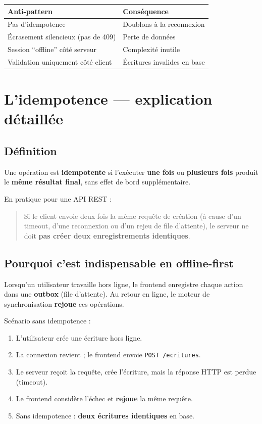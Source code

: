 \documentclass[12pt,a4paper]{report}
\begin{document}
\begin{longtable}{@{}p{5cm}p{7.5cm}@{}}
\hline
\textbf{Anti-pattern} & \textbf{Conséquence} \\
\hline
\endhead
Pas d'idempotence & Doublons à la reconnexion \\
\hline
Écrasement silencieux (pas de 409) & Perte de données \\
\hline
Session ``offline'' côté serveur & Complexité inutile \\
\hline
Validation uniquement côté client & Écritures invalides en base \\
\hline
\end{longtable}

\chapter{L'idempotence --- explication détaillée}

\section{Définition}

Une opération est \textbf{idempotente} si l'exécuter \textbf{une fois} ou \textbf{plusieurs fois} produit le \textbf{même résultat final}, sans effet de bord supplémentaire.

En pratique pour une API REST :
\begin{quote}
Si le client envoie deux fois la même requête de création (à cause d'un timeout, d'une reconnexion ou d'un rejeu de file d'attente), le serveur ne doit \textbf{pas créer deux enregistrements identiques}.
\end{quote}

\section{Pourquoi c'est indispensable en offline-first}

Lorsqu'un utilisateur travaille hors ligne, le frontend enregistre chaque action dans une \textbf{outbox} (file d'attente). Au retour en ligne, le moteur de synchronisation \textbf{rejoue} ces opérations.

Scénario sans idempotence :
\begin{enumerate}
  \item L'utilisateur crée une écriture hors ligne.
  \item La connexion revient ; le frontend envoie \texttt{POST /ecritures}.
  \item Le serveur reçoit la requête, crée l'écriture, mais la réponse HTTP est perdue (timeout).
  \item Le frontend considère l'échec et \textbf{rejoue} la même requête.
  \item Sans idempotence : \textbf{deux écritures identiques} en base.
\end{enumerate}
\end{document}
